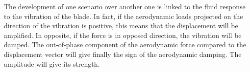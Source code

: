 The development of one scenario over another one is linked to
the fluid response to the vibration of the blade. In fact,
if the aerodynamic loads projected on the direction of the vibration
is positive, this means that the displacement will be amplified. 
In opposite, if the force is in opposed direction, the vibration will be damped.
The out-of-phase component of the aerodynamic force compared to
the displacement vector will give finally the sign of the aerodynamic damping.
The amplitude will give its strength. 


